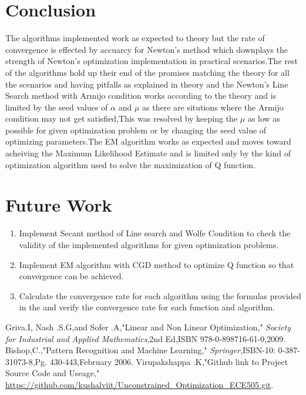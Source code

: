 \documentclass[paper=a4, fontsize=11pt]{scrartcl}
\numberwithin{equation}{section}		%
\numberwithin{figure}{section}			%
\numberwithin{table}{section}				%
\begin{document}
\section{Conclusion}
The algorithms implemented work as expected to theory but the rate of convergence is effected by accuarcy for Newton's method which downplays the strength of Newton's optimization implementation in practical scenarios.The rest of the algorithms hold up their end of the promises matching the theory for all the scenarios and having pitfalls as explained in theory and the Newton's Line Search method with Armijo condition works according to the theory and is limited by the seed values of $\alpha$ and $\mu$ as there are situtions where the Armijo condition may not get satisfied,This was resolved by keeping the $\mu$ as low as possible for given optimization problem or by changing the seed value of optimizing parameters.The EM algorithm works as expected and moves toward acheiving the Maximum Likelihood Estimate and is limited only by the kind of optimization algorithm used to solve the maximization of Q function. \\

\section{Future Work}
\begin{enumerate}
   \item Implement Secant method of Line search and Wolfe Condition to check the validity of the implemented algorithms for given optimization problems.
   \item Implement EM algorithm with CGD method to optimize Q function so that convergence can be achieved.
   \item Calculate the convergence rate for each algorithm using the formulas provided in the \cite{one} and verify the convergence rate for each function and algorithm.
\end{enumerate}

\begin{thebibliography}{100}  %
 Griva.I, Nash .S.G,and Sofer .A,"Linear and Non Linear Optimization," \emph{Society for Industrial and Applied Mathematics},2nd Ed,ISBN 978-0-898716-61-0,2009.
 Bishop,C.,"Pattern Recognition and Machine Learning," \emph{Springer},ISBN-10: 0-387-31073-8,Pg. 430-443,February 2006.
 Virupakshappa .K,"Github link to Project Source Code and Useage," \url{https://github.com/kushalviit/Unconstrained_Optimization_ECE505.git}.
\end{thebibliography}
\end{document}
